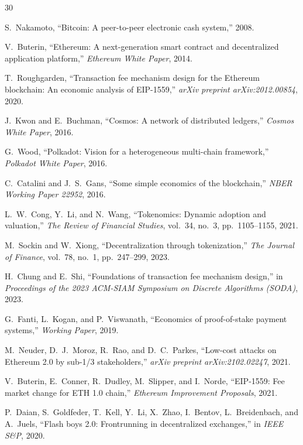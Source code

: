 
\begin{thebibliography}{30}

S.~Nakamoto, ``Bitcoin: A peer-to-peer electronic cash system,'' 2008.

V.~Buterin, ``Ethereum: A next-generation smart contract and decentralized application platform,'' \emph{Ethereum White Paper}, 2014.

T.~Roughgarden, ``Transaction fee mechanism design for the Ethereum blockchain: An economic analysis of EIP-1559,'' \emph{arXiv preprint arXiv:2012.00854}, 2020.

J.~Kwon and E.~Buchman, ``Cosmos: A network of distributed ledgers,'' \emph{Cosmos White Paper}, 2016.

G.~Wood, ``Polkadot: Vision for a heterogeneous multi-chain framework,'' \emph{Polkadot White Paper}, 2016.

C.~Catalini and J.~S.~Gans, ``Some simple economics of the blockchain,'' \emph{NBER Working Paper 22952}, 2016.

L.~W.~Cong, Y.~Li, and N.~Wang, ``Tokenomics: Dynamic adoption and valuation,'' \emph{The Review of Financial Studies}, vol.~34, no.~3, pp.~1105--1155, 2021.

M.~Sockin and W.~Xiong, ``Decentralization through tokenization,'' \emph{The Journal of Finance}, vol.~78, no.~1, pp.~247--299, 2023.

H.~Chung and E.~Shi, ``Foundations of transaction fee mechanism design,'' in \emph{Proceedings of the 2023 ACM-SIAM Symposium on Discrete Algorithms (SODA)}, 2023.

G.~Fanti, L.~Kogan, and P.~Viswanath, ``Economics of proof-of-stake payment systems,'' \emph{Working Paper}, 2019.

M.~Neuder, D.~J.~Moroz, R.~Rao, and D.~C.~Parkes, ``Low-cost attacks on Ethereum 2.0 by sub-1/3 stakeholders,'' \emph{arXiv preprint arXiv:2102.02247}, 2021.

V.~Buterin, E.~Conner, R.~Dudley, M.~Slipper, and I.~Norde, ``EIP-1559: Fee market change for ETH 1.0 chain,'' \emph{Ethereum Improvement Proposals}, 2021.

P.~Daian, S.~Goldfeder, T.~Kell, Y.~Li, X.~Zhao, I.~Bentov, L.~Breidenbach, and A.~Juels, ``Flash boys 2.0: Frontrunning in decentralized exchanges,'' in \emph{IEEE S\&P}, 2020.


\end{thebibliography}
